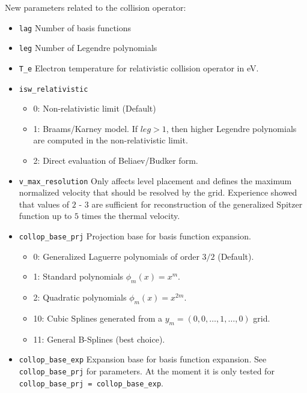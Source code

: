 \documentclass{article}
\begin{document}
New parameters related to the collision operator:
\begin{itemize}
 \item \verb|lag|\newline
 Number of basis functions
 \item \verb|leg|\newline
 Number of Legendre polynomials
 \item \verb|T_e|\newline
 Electron temperature for relativistic collision operator in eV.
 \item \verb|isw_relativistic|
 \begin{itemize}
  \item 0: Non-relativistic limit (Default)
  \item 1: Braams/Karney model. If $leg>1$, then higher Legendre
  polynomials are computed in the non-relativistic limit.
  \item 2: Direct evaluation of Beliaev/Budker form.
 \end{itemize}
 \item \verb|v_max_resolution|\newline
 Only affects level placement and defines the maximum normalized
 velocity that should be resolved by the grid. Experience showed that
 values of $2$ - $3$ are sufficient for reconstruction of the
 generalized Spitzer function up to $5$ times the thermal velocity.
 \item \verb|collop_base_prj|\newline
 Projection base for basis function expansion.
 \begin{itemize}
  \item 0: Generalized Laguerre polynomials of order $3/2$ (Default).
  \item 1: Standard polynomials $\phi_m(x) = x^m$.
  \item 2: Quadratic polynomials $\phi_m(x) = x^{2m}$.
  \item 10: Cubic Splines generated from a $y_m = (0, 0, \dotsc, 1, \dotsc, 0)$ grid.
  \item 11: General B-Splines (best choice).
 \end{itemize}

 \item \verb|collop_base_exp|\newline
 Expansion base for basis function expansion. See \verb|collop_base_prj|
 for parameters. At the moment it is only tested for
 \verb|collop_base_prj = collop_base_exp|.


\end{itemize}
\end{document}
